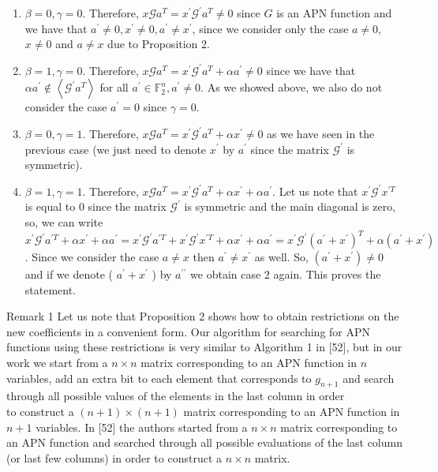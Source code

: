 \documentclass[10pt]{article}
\begin{document}
\begin{enumerate}
  \item $\beta=0, \gamma=0$. Therefore, $x \mathcal{G} a^{T}=x^{\prime} \mathcal{G}^{\prime} a^{T} \neq 0$ since $G$ is an APN function and we have that $a^{\prime} \neq 0, x^{\prime} \neq 0, a^{\prime} \neq x^{\prime}$, since we consider only the case $a \neq 0$, $x \neq 0$ and $a \neq x$ due to Proposition 2.
  \item $\beta=1, \gamma=0$. Therefore, $x \mathcal{G} a^{T}=x^{\prime} \mathcal{G}^{\prime} a^{T}+\alpha a^{\prime} \neq 0$ since we have that $\alpha a^{\prime} \notin\left\langle\mathcal{G}^{\prime} a^{T}\right\rangle$ for all $a^{\prime} \in \mathbb{F}_{2}^{n}, a^{\prime} \neq 0$. As we showed above, we also do not consider the case $a^{\prime}=0$ since $\gamma=0$.
  \item $\beta=0, \gamma=1$. Therefore, $x \mathcal{G} a^{T}=x^{\prime} \mathcal{G}^{\prime} a^{T}+\alpha x^{\prime} \neq 0$ as we have seen in the previous case (we just need to denote $x^{\prime}$ by $a^{\prime}$ since the matrix $\mathcal{G}^{\prime}$ is symmetric).
  \item $\beta=1, \gamma=1$. Therefore, $x \mathcal{G} a^{T}=x^{\prime} \mathcal{G}^{\prime} a^{T}+\alpha x^{\prime}+\alpha a^{\prime}$. Let us note that $x^{\prime} \mathcal{G}^{\prime} x^{\prime T}$ is equal to 0 since the matrix $\mathcal{G}^{\prime}$ is symmetric and the main diagonal is zero, so, we can write $x^{\prime} \mathcal{G}^{\prime} a^{\prime T}+\alpha x^{\prime}+\alpha a^{\prime}=x^{\prime} \mathcal{G}^{\prime} a^{\prime T}+x^{\prime} \mathcal{G}^{\prime} x^{\prime T}+\alpha x^{\prime}+\alpha a^{\prime}= x^{\prime} \mathcal{G}^{\prime}\left(a^{\prime}+x^{\prime}\right)^{T}+\alpha\left(a^{\prime}+x^{\prime}\right)$. Since we consider the case $a \neq x$ then $a^{\prime} \neq x^{\prime}$ as well. So, $\left(a^{\prime}+x^{\prime}\right) \neq 0$ and if we denote ( $a^{\prime}+x^{\prime}$ ) by $a^{\prime \prime}$ we obtain case 2 again. This proves the statement.
\end{enumerate}

Remark 1 Let us note that Proposition 2 shows how to obtain restrictions on the new coefficients in a convenient form. Our algorithm for searching for APN functions using these restrictions is very similar to Algorithm 1 in [52], but in our work we start from a $n \times n$ matrix corresponding to an APN function in $n$ variables, add an extra bit to each element that corresponds to $g_{n+1}$ and search through all possible values of the elements in the last column in order\\
to construct a $(n+1) \times(n+1)$ matrix corresponding to an APN function in $n+1$ variables. In [52] the authors started from a $n \times n$ matrix corresponding to an APN function and searched through all possible evaluations of the last column (or last few columns) in order to construct a $n \times n$ matrix.
\end{document}
